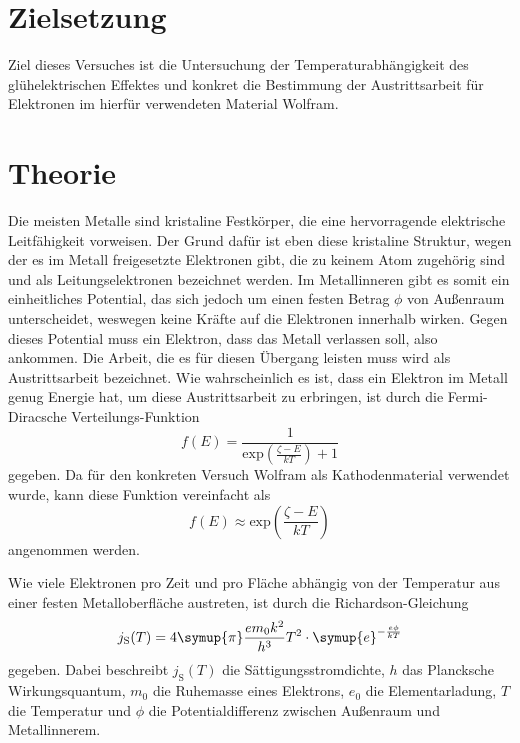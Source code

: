 \section{Zielsetzung}
Ziel dieses Versuches ist die Untersuchung der Temperaturabhängigkeit des glühelektrischen Effektes und konkret die Bestimmung der Austrittsarbeit für Elektronen im
hierfür verwendeten Material Wolfram.

\section{Theorie}
\label{sec:Theorie}

Die meisten Metalle sind kristaline Festkörper, die eine hervorragende elektrische Leitfähigkeit vorweisen. Der Grund dafür ist eben diese kristaline Struktur, wegen
der es im Metall freigesetzte Elektronen gibt, die zu keinem Atom zugehörig sind und als Leitungselektronen bezeichnet werden. Im Metallinneren gibt es somit ein
einheitliches Potential, das sich jedoch um einen festen Betrag $\phi$ von Außenraum unterscheidet, weswegen keine Kräfte auf die Elektronen innerhalb wirken.
\newline
Gegen dieses Potential muss ein Elektron, dass das Metall verlassen soll, also ankommen. Die Arbeit, die es für diesen Übergang leisten muss wird als Austrittsarbeit
bezeichnet. Wie wahrscheinlich es ist, dass ein Elektron im Metall genug Energie hat, um diese Austrittsarbeit zu erbringen, ist durch die Fermi-Diracsche
Verteilungs-Funktion 
\begin{equation}
    \label{eqn:Fermi_Dirac}
    f(E) = \frac{1}{\mathrm{exp}\left( \frac{\zeta - E}{kT} \right) + 1}
\end{equation}
gegeben. Da für den konkreten Versuch Wolfram als Kathodenmaterial verwendet wurde, kann diese Funktion vereinfacht als
\begin{equation}
    \label{eqn:Fermi_Dirac}
    f(E) \approx \mathrm{exp}\left( \frac{\zeta - E}{kT} \right)
\end{equation}
angenommen werden.


Wie viele Elektronen pro Zeit und pro Fläche abhängig von der Temperatur aus einer festen Metalloberfläche austreten, ist durch die Richardson-Gleichung 
\begin{equation}
    j_\text{S}(T) = 4 \symup{\pi}\frac{e m_0 k^2}{h^3}T^2 \cdot \symup{e}^{-\frac{e\phi}{kT}}
    \label{eqn:J_S}
\end{equation}
gegeben. Dabei beschreibt $j_\text{S}(T)$ die Sättigungsstromdichte, $h$ das Plancksche Wirkungsquantum, $m_0$ die Ruhemasse eines Elektrons, $e_0$ die Elementarladung,
$T$ die Temperatur und $\phi$ die Potentialdifferenz zwischen Außenraum und Metallinnerem.

